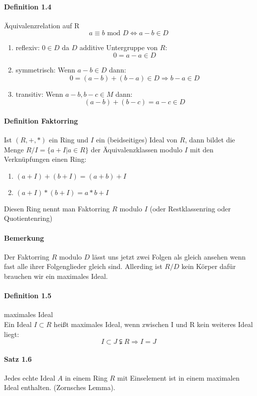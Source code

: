 \documentclass[a4paper]{article}
\begin{document}
\paragraph{Definition 1.4} Äquivalenzrelation auf R  %
$$ a \equiv b \text{ mod } D \iff a - b \in D $$
\begin{enumerate}
      \item reflexiv: $ 0 \in D  $ da $ D $ additive Untergruppe von $ R $: 
      $$ 0 =  a - a \in D $$
     \item symmetrisch: Wenn $ a - b \in D $ dann:
      $$  0 = (a - b) + (b - a) \in D \Rightarrow b - a \in D $$
     \item transitiv: Wenn $ a - b, b - c \in M $ dann:
      $$ (a - b) + (b - c) = a - c \in D $$
\end{enumerate}

\paragraph{Definition Faktorring} Ist $ (R,+,*) $ ein Ring und $ I $ ein (beidseitiges) Ideal
von $ R $, dann bildet die Menge $ R/I = \{a + I | a \in R\} $ der Äquivalenzklassen modulo
$ I $ mit den Verknüpfungen einen Ring:
\begin{enumerate}
    \item $ (a + I) + (b + I) = (a + b) + I  $ 
    \item $ (a + I) * (b + I) = a * b + I $
\end{enumerate}
Diesen Ring nennt man Faktorring $ R $ modulo $ I $ (oder Restklassenring oder Quotientenring)

\paragraph{Bemerkung} Der Faktorring $ R $ modulo $ D $ lässt uns jetzt zwei Folgen als 
gleich ansehen wenn fast alle ihrer Folgenglieder gleich sind. Allerding ist $ R / D $ kein Körper
dafür brauchen wir ein maximales Ideal. 

\paragraph{Definition 1.5} maximales Ideal \\
Ein Ideal $ I \subset R $ heißt maximales Ideal, wenn zwischen I und R kein weiteres Ideal liegt:
$$ I \subset J \subsetneqq R \Rightarrow I = J$$


\paragraph{Satz 1.6} Jedes echte Ideal $ A $ in einem Ring $ R $ mit Einselement ist in einem maximalen Ideal enthalten. (Zornsches Lemma).
\bigskip
\end{document}
